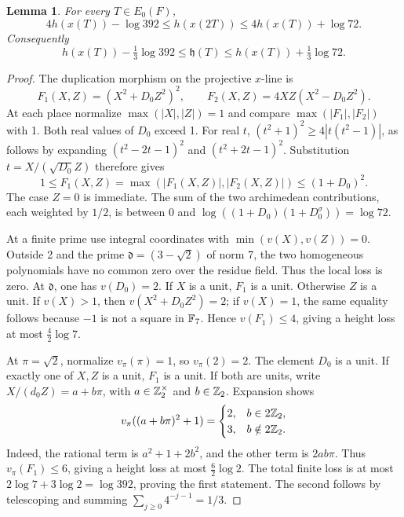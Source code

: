 \documentclass[11pt]{article}
\newtheorem{lemma}[theorem]{Lemma}
\theoremstyle{definition}
\begin{document}
\begin{lemma}\label{lem:duplication-height}
For every \(T\in E_0(F)\),
\[
 4h(x(T))-\log392\le h(x(2T))\le4h(x(T))+\log72.
\]
Consequently
\begin{equation}\label{eq:explicit-height-comparison}
 h(x(T))-\tfrac13\log392\le\mathfrak h(T)
       \le h(x(T))+\tfrac13\log72.
\end{equation}
\end{lemma}
\begin{proof}
The duplication morphism on the projective \(x\)-line is
\[
 F_1(X,Z)=(X^2+D_0Z^2)^2,\qquad
 F_2(X,Z)=4XZ(X^2-D_0Z^2).
\]
At each place normalize \(\max(|X|,|Z|)=1\) and compare
\(\max(|F_1|,|F_2|)\) with 1. Both real values of \(D_0\)
exceed 1. For real \(t\),
\((t^2+1)^2\ge4|t(t^2-1)|\), as follows by expanding
\((t^2-2t-1)^2\) and \((t^2+2t-1)^2\).
Substitution \(t=X/(\sqrt{D_0}Z)\) therefore gives
\[
 1\le F_1(X,Z)=\max(|F_1(X,Z)|,|F_2(X,Z)|)
       \le(1+D_0)^2.
\]
The case \(Z=0\) is immediate. The sum of the two archimedean
contributions, each weighted by \(1/2\), is between 0 and
\(\log((1+D_0)(1+D_0^\sigma))=\log72\).

At a finite prime use integral coordinates with
\(\min(v(X),v(Z))=0\). Outside 2 and the prime
\(\mathfrak d=(3-\sqrt2)\) of norm 7, the two homogeneous
polynomials have no common zero over the residue field. Thus the
local loss is zero. At \(\mathfrak d\), one has \(v(D_0)=2\).
If \(X\) is a unit, \(F_1\) is a unit. Otherwise \(Z\) is a
unit. If \(v(X)>1\), then \(v(X^2+D_0Z^2)=2\); if
\(v(X)=1\), the same equality follows because \(-1\) is not
a square in \(\mathbb F_7\). Hence \(v(F_1)\le4\), giving a height
loss at most \(\tfrac42\log7\).

At \(\pi=\sqrt2\), normalize \(v_\pi(\pi)=1\), so
\(v_\pi(2)=2\). The element \(D_0\) is a unit. If exactly
one of \(X,Z\) is a unit, \(F_1\) is a unit. If both are
units, write \(X/(d_0Z)=a+b\pi\), with \(a\in\mathbb Z_2^\times\)
and \(b\in\mathbb Z_2\). Expansion shows
\[
 v_\pi((a+b\pi)^2+1)=
 \begin{cases}2,&b\in2\mathbb Z_2,\\3,&b\notin2\mathbb Z_2.\end{cases}
\]
Indeed, the rational term is \(a^2+1+2b^2\), and the other
term is \(2ab\pi\). Thus \(v_\pi(F_1)\le6\), giving a
height loss at most \(\tfrac62\log2\).
The total finite loss is at most
\(2\log7+3\log2=\log392\), proving the first statement.
The second follows by telescoping and summing
\(\sum_{j\ge0}4^{-j-1}=1/3\).
\end{proof}
\end{document}
